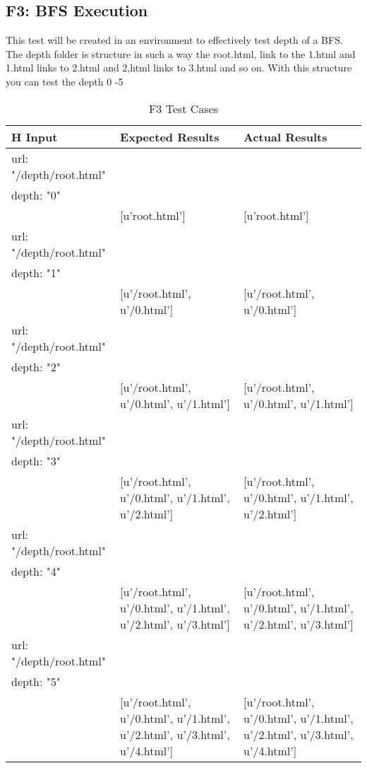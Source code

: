 \documentclass[12pt, titlepage]{article}
\begin{document}
\pagebreak

\subsection{F3: BFS Execution}
This test will be created in an environment to effectively test depth of a BFS. The depth folder is structure in such a way the root.html, link to the 1.html and 1.html links to 2.html and 2,html links to 3.html and so on. With this structure you can test the depth 0 -5
\begin{table}[h!]
\centering
\begin{tabular}{ p{7cm}  p{4cm}  p{4cm} }{H}
	Input &Expected Results &Actual Results\\ \hline
	url: "/depth/root.html"\\
	depth: "0"\\
	&[u'root.html']& [u'root.html']\\ \hline
	url: "/depth/root.html"\\
	depth: "1"\\
	 & [u'/root.html', u'/0.html'] & [u'/root.html', u'/0.html'] \\ \hline
	url: "/depth/root.html"\\
	depth: "2"\\
	 & [u'/root.html', u'/0.html', u'/1.html'] & [u'/root.html', u'/0.html', u'/1.html']\\ \hline
	url: "/depth/root.html"\\
	depth: "3"\\
	 & [u'/root.html', u'/0.html', u'/1.html', u'/2.html'] & [u'/root.html', u'/0.html', u'/1.html', u'/2.html']\\ \hline
	url: "/depth/root.html"\\
	depth: "4"\\
	 & [u'/root.html', u'/0.html', u'/1.html', u'/2.html', u'/3.html'] & [u'/root.html', u'/0.html', u'/1.html', u'/2.html', u'/3.html']\\ \hline
	url: "/depth/root.html"\\
	depth: "5"\\
	& [u'/root.html', u'/0.html', u'/1.html', u'/2.html', u'/3.html', u'/4.html'] & [u'/root.html', u'/0.html', u'/1.html', u'/2.html', u'/3.html', u'/4.html']\\ \hline

\end{tabular}
\caption{F3 Test Cases}
\label{table:F3 Test Cases}
\end{table}
\end{document}
